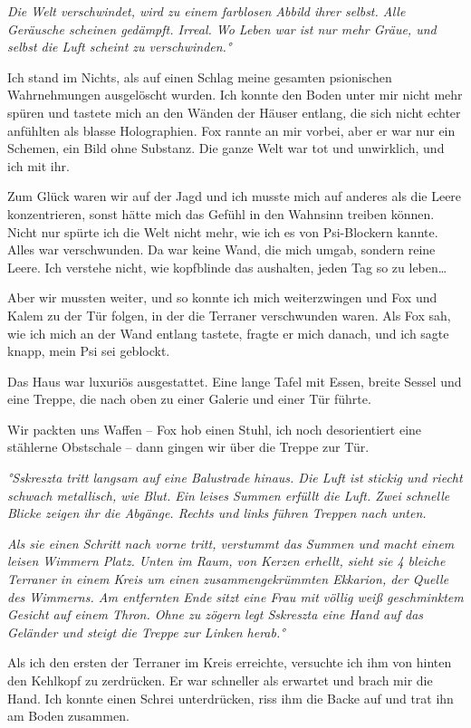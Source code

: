 \documentclass[11pt]{scrartcl}
\begin{document}
\emph{Die Welt verschwindet, wird zu einem farblosen Abbild ihrer
selbst. Alle Geräusche scheinen gedämpft. Irreal. Wo Leben war ist nur
mehr Gräue, und selbst die Luft scheint zu verschwinden.°}

Ich stand im Nichts, als auf einen Schlag meine gesamten psionischen
Wahrnehmungen ausgelöscht wurden. Ich konnte den Boden unter mir nicht
mehr spüren und tastete mich an den Wänden der Häuser entlang, die sich
nicht echter anfühlten als blasse Holographien. Fox rannte an mir
vorbei, aber er war nur ein Schemen, ein Bild ohne Substanz. Die ganze
Welt war tot und unwirklich, und ich mit ihr.

Zum Glück waren wir auf der Jagd und ich musste mich auf anderes als die
Leere konzentrieren, sonst hätte mich das Gefühl in den Wahnsinn treiben
können. Nicht nur spürte ich die Welt nicht mehr, wie ich es von
Psi-Blockern kannte. Alles war verschwunden. Da war keine Wand, die mich
umgab, sondern reine Leere. Ich verstehe nicht, wie kopfblinde das
aushalten, jeden Tag so zu leben\ldots{}

Aber wir mussten weiter, und so konnte ich mich weiterzwingen und Fox
und Kalem zu der Tür folgen, in der die Terraner verschwunden waren. Als
Fox sah, wie ich mich an der Wand entlang tastete, fragte er mich
danach, und ich sagte knapp, mein Psi sei geblockt.

Das Haus war luxuriös ausgestattet. Eine lange Tafel mit Essen, breite
Sessel und eine Treppe, die nach oben zu einer Galerie und einer Tür
führte.

Wir packten uns Waffen -- Fox hob einen Stuhl, ich noch desorientiert
eine stählerne Obstschale -- dann gingen wir über die Treppe zur Tür.

\emph{°Sskreszta tritt langsam auf eine Balustrade hinaus. Die Luft ist
stickig und riecht schwach metallisch, wie Blut. Ein leises Summen
erfüllt die Luft. Zwei schnelle Blicke zeigen ihr die Abgänge. Rechts
und links führen Treppen nach unten.}

\emph{Als sie einen Schritt nach vorne tritt, verstummt das Summen und
macht einem leisen Wimmern Platz. Unten im Raum, von Kerzen erhellt,
sieht sie 4 bleiche Terraner in einem Kreis um einen zusammengekrümmten
Ekkarion, der Quelle des Wimmerns. Am entfernten Ende sitzt eine Frau
mit völlig weiß geschminktem Gesicht auf einem Thron. Ohne zu zögern
legt Sskreszta eine Hand auf das Geländer und steigt die Treppe zur
Linken herab.°}

Als ich den ersten der Terraner im Kreis erreichte, versuchte ich ihm
von hinten den Kehlkopf zu zerdrücken. Er war schneller als erwartet und
brach mir die Hand. Ich konnte einen Schrei unterdrücken, riss ihm die
Backe auf und trat ihn am Boden zusammen.
\end{document}
